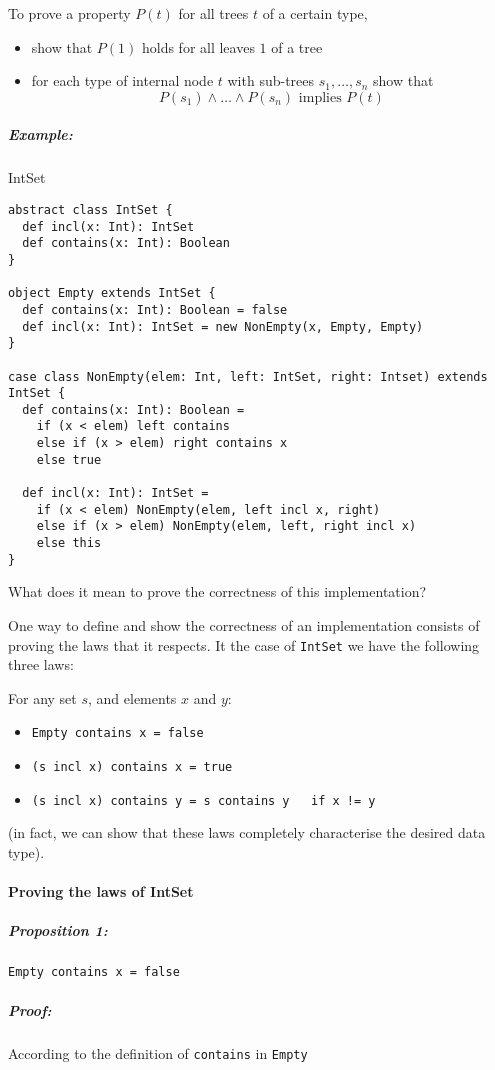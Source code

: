 \documentclass{scrartcl}
\newcommand{\example}{\subparagraph{Example:}} %
\begin{document}
To prove a property $P(t)$ for all trees $t$ of a certain type,
\begin{itemize}
\item show that $P(1)$ holds for all leaves $1$ of a tree
\item for each type of internal node $t$ with sub-trees $s_1, \dots, s_n$ show
  that
$$P(s_1) \wedge \dots \wedge P(s_n) \text{ implies }P(t)$$
\end{itemize}
\example IntSet

\begin{lstlisting}
abstract class IntSet {
  def incl(x: Int): IntSet
  def contains(x: Int): Boolean
}

object Empty extends IntSet {
  def contains(x: Int): Boolean = false
  def incl(x: Int): IntSet = new NonEmpty(x, Empty, Empty)
}

case class NonEmpty(elem: Int, left: IntSet, right: Intset) extends IntSet {
  def contains(x: Int): Boolean =
    if (x < elem) left contains
    else if (x > elem) right contains x
    else true

  def incl(x: Int): IntSet =
    if (x < elem) NonEmpty(elem, left incl x, right)
    else if (x > elem) NonEmpty(elem, left, right incl x)
    else this
}
\end{lstlisting}

What does it mean to prove the correctness of this implementation?

One way to define and show the correctness of an implementation consists of
proving the laws that it respects. It the case of \lstinline|IntSet| we have the
following three laws:

For any set $s$, and elements $x$ and $y$:
\begin{itemize}
\item \lstinline|Empty contains x = false|
\item \lstinline|(s incl x) contains x = true|
\item \lstinline|(s incl x) contains y = s contains y   if x != y|
\end{itemize}
(in fact, we can show that these laws completely characterise the desired data
type).

\paragraph{Proving the laws of IntSet}

\subparagraph{Proposition 1:} \lstinline|Empty contains x = false|
\subparagraph{Proof:} According to the definition of \lstinline|contains| in
\lstinline|Empty|
\end{document}
